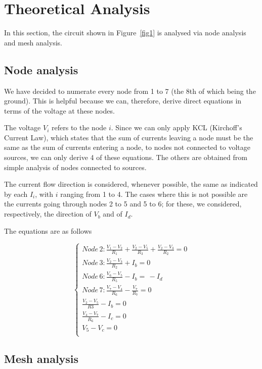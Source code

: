 \section{Theoretical Analysis}
\label{sec:analysis}

In this section, the circuit shown in Figure~\ref{fig1} is analysed via node analysis and mesh analysis.

\subsection{Node analysis}

We have decided to numerate every node from 1 to 7 (the 8th of which being the ground). This is helpful because we can, therefore, derive direct equations in terms of the voltage at these nodes.

The voltage $V_i$ refers to the node $i$. Since we can only apply KCL (Kirchoff's Current Law), which states that the sum of currents leaving a node must be the same as the sum of currents entering a node, to nodes not connected to voltage sources, we can only derive 4 of these equations. The others are obtained from simple analysis of nodes connected to sources.

The current flow direction is considered, whenever possible, the same as indicated by each $I_i$, with $i$ ranging from 1 to 4. The cases where this is not possible are the currents going through nodes 2 to 5 and 5 to 6; for these, we considered, respectively, the direction of $V_b$ and of $I_d$.

The equations are as follows

\begin{equation} 
\begin{cases}  
    Node\, 2: \frac{V_1 - V_2}{R_1} + \frac{V_2 - V_5}{R_3} + \frac{V_2 - V_3}{R_2} = 0 \\
    Node\, 3: \frac{V_2 - V_3}{R_2} + I_b = 0 \\
    Node\, 6: \frac{V_6 - V_5}{R_5} - I_b = \,  - I_d \\
    Node\, 7: \frac{V_7 - V_4}{R_6} - \frac{V_7}{R_7} = 0 \\
    \frac{V_2 - V_5}{R3} - I_b = 0 \\
    \frac{V_4 - V_7}{R_6} - I_c = 0\\
    V_5 - V_c = 0\\
\end{cases}
\label{eq:1}
\end{equation}

\subsection{Mesh analysis}

